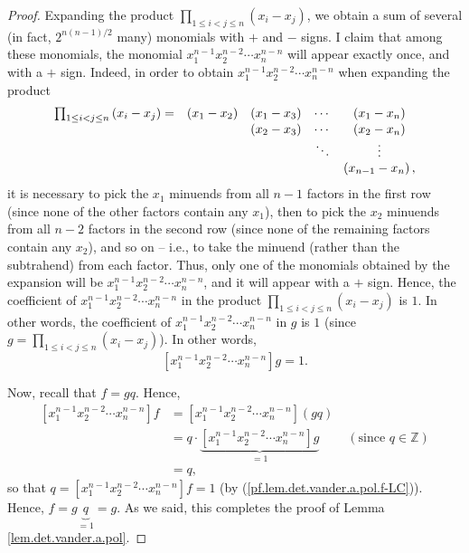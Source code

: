 \begin{proof}
Expanding the product $\prod_{1\leq i<j\leq n}\left(  x_{i}-x_{j}\right)  $,
we obtain a sum of several (in fact, $2^{n\left(  n-1\right)  /2}$ many)
monomials with $+$ and $-$ signs. I claim that among these monomials, the
monomial $x_{1}^{n-1}x_{2}^{n-2}\cdots x_{n}^{n-n}$ will appear exactly once,
and with a $+$ sign. Indeed, in order to obtain $x_{1}^{n-1}x_{2}^{n-2}\cdots
x_{n}^{n-n}$ when expanding the product
\[%
\begin{array}
[c]{ccccc}%
\prod_{1\leq i<j\leq n}\left(  x_{i}-x_{j}\right)  = & \left(  x_{1}%
-x_{2}\right)  & \left(  x_{1}-x_{3}\right)  & \cdots & \left(  x_{1}%
-x_{n}\right) \\
&  & \left(  x_{2}-x_{3}\right)  & \cdots & \left(  x_{2}-x_{n}\right) \\
&  &  & \ddots & \vdots\\
&  &  &  & \left(  x_{n-1}-x_{n}\right)  ,
\end{array}
\]
it is necessary to pick the $x_{1}$ minuends from all $n-1$ factors in the
first row (since none of the other factors contain any $x_{1}$), then to pick
the $x_{2}$ minuends from all $n-2$ factors in the second row (since none of
the remaining factors contain any $x_{2}$), and so on -- i.e., to take the
minuend (rather than the subtrahend) from each factor. Thus, only one of the
monomials obtained by the expansion will be $x_{1}^{n-1}x_{2}^{n-2}\cdots
x_{n}^{n-n}$, and it will appear with a $+$ sign. Hence, the coefficient of
$x_{1}^{n-1}x_{2}^{n-2}\cdots x_{n}^{n-n}$ in the product $\prod_{1\leq
i<j\leq n}\left(  x_{i}-x_{j}\right)  $ is $1$. In other words, the
coefficient of $x_{1}^{n-1}x_{2}^{n-2}\cdots x_{n}^{n-n}$ in $g$ is $1$ (since
$g=\prod_{1\leq i<j\leq n}\left(  x_{i}-x_{j}\right)  $). In other words,%
\[
\left[  x_{1}^{n-1}x_{2}^{n-2}\cdots x_{n}^{n-n}\right]  g=1.
\]


Now, recall that $f=gq$. Hence,%
\begin{align*}
\left[  x_{1}^{n-1}x_{2}^{n-2}\cdots x_{n}^{n-n}\right]  f  &  =\left[
x_{1}^{n-1}x_{2}^{n-2}\cdots x_{n}^{n-n}\right]  \left(  gq\right) \\
&  =q\cdot\underbrace{\left[  x_{1}^{n-1}x_{2}^{n-2}\cdots x_{n}^{n-n}\right]
g}_{=1}\ \ \ \ \ \ \ \ \ \ \left(  \text{since }q\in\mathbb{Z}\right) \\
&  =q,
\end{align*}
so that $q=\left[  x_{1}^{n-1}x_{2}^{n-2}\cdots x_{n}^{n-n}\right]  f=1$ (by
(\ref{pf.lem.det.vander.a.pol.f-LC})). Hence, $f=g\underbrace{q}_{=1}=g$. As
we said, this completes the proof of Lemma \ref{lem.det.vander.a.pol}.
\end{proof}

